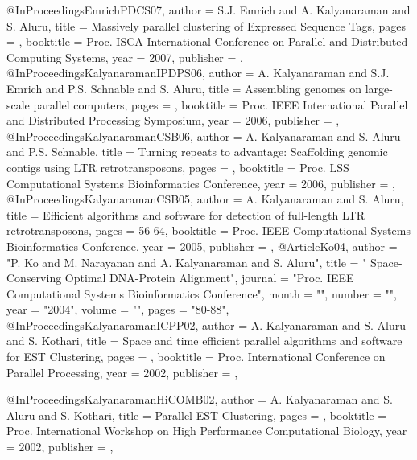 @InProceedings{EmrichPDCS07,
  author =       {S.J. Emrich and A. Kalyanaraman and S. Aluru},
  title =        {Massively parallel clustering of Expressed Sequence Tags},
  pages =        {},
  booktitle =    {Proc. ISCA International Conference on Parallel and Distributed Computing Systems},
  year =         {2007},
  publisher =    {},
}
@InProceedings{KalyanaramanIPDPS06,
  author =       {A. Kalyanaraman and S.J. Emrich and P.S. Schnable and S. Aluru},
  title =        {Assembling genomes on large-scale parallel computers},
  pages =        {},
  booktitle =    {Proc. IEEE International Parallel and Distributed Processing Symposium},
  year =         {2006},
  publisher =    {},
}
@InProceedings{KalyanaramanCSB06,
  author =       {A. Kalyanaraman and S. Aluru and P.S. Schnable},
  title =        {{Turning repeats to advantage: Scaffolding genomic contigs using LTR retrotransposons}},
  pages =        {},
  booktitle =    {Proc. LSS Computational Systems Bioinformatics Conference},
  year =         {2006},
  publisher =    {},
}
@InProceedings{KalyanaramanCSB05,
  author =       {A. Kalyanaraman and S. Aluru},
  title =        {{Efficient algorithms and software for detection of full-length LTR retrotransposons}},
  pages =        {56-64},
  booktitle =    {Proc. IEEE Computational Systems Bioinformatics Conference},
  year =         {2005},
  publisher =    {},
}
@Article{Ko04,
   author =   "P. Ko and M. Narayanan and A. Kalyanaraman and S. Aluru",
   title =   " Space-Conserving Optimal {DNA}-Protein Alignment",
   journal =   "Proc. IEEE Computational Systems Bioinformatics Conference",
   month = "",
   number = "",
   year =   "2004",
   volume =   "",
   pages =   "80-88",
}
@InProceedings{KalyanaramanICPP02,
  author =       {A. Kalyanaraman and S. Aluru and S. Kothari},
  title =        {Space and time efficient parallel algorithms and software for {EST} Clustering},
  pages =        {},
  booktitle =    {Proc. International Conference on Parallel Processing},
  year =         {2002},
  publisher =    {},
}

@InProceedings{KalyanaramanHiCOMB02,
  author =       {A. Kalyanaraman and S. Aluru and S. Kothari},
  title =        {Parallel {EST} Clustering},
  pages =        {},
  booktitle =    {Proc. International Workshop on High Performance Computational Biology},
  year =         {2002},
  publisher =    {},
}

